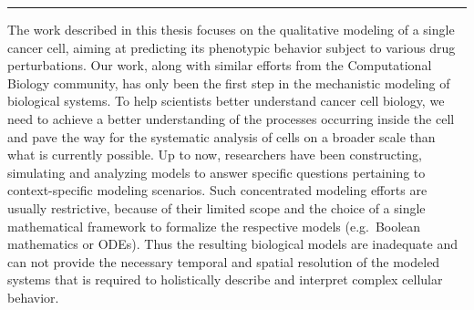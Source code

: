 \documentclass[
  12pt,
]{book}
\begin{document}
\begin{center}\rule{0.5\linewidth}{0.5pt}\end{center}

The work described in this thesis focuses on the qualitative modeling of a single cancer cell, aiming at predicting its phenotypic behavior subject to various drug perturbations.
Our work, along with similar efforts from the Computational Biology community, has only been the first step in the mechanistic modeling of biological systems.
To help scientists better understand cancer cell biology, we need to achieve a better understanding of the processes occurring inside the cell and pave the way for the systematic analysis of cells on a broader scale than what is currently possible.
Up to now, researchers have been constructing, simulating and analyzing models to answer specific questions pertaining to context-specific modeling scenarios.
Such concentrated modeling efforts are usually restrictive, because of their limited scope and the choice of a single mathematical framework to formalize the respective models (e.g.~Boolean mathematics or ODEs).
Thus the resulting biological models are inadequate and can not provide the necessary temporal and spatial resolution of the modeled systems that is required to holistically describe and interpret complex cellular behavior.
\end{document}
